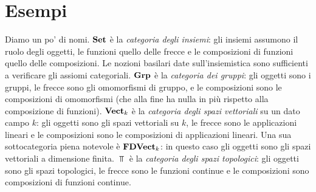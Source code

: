 
\section{Esempi}


\begin{esempio}
Diamo un po' di nomi.\newline
\(\mathbf{Set}\) è la {\em categoria degli insiemi}: gli insiemi assumono il ruolo degli oggetti, le funzioni quello delle frecce e le composizioni di funzioni quello delle composizioni. Le nozioni basilari date sull'insiemistica sono sufficienti a verificare gli assiomi categoriali.\newline
\(\mathbf{Grp}\) è la {\em categoria dei gruppi}: gli oggetti sono i gruppi, le frecce sono gli omomorfismi di gruppo, e le composizioni sono le composizioni di omomorfismi (che alla fine ha nulla in più rispetto alla composizione di funzioni).\newline
\(\mathbf{Vect}_k\) è la {\em categoria degli spazi vettoriali} su un dato campo \(k\): gli oggetti sono gli spazi vettoriali su \(k\), le frecce sono le applicazioni lineari e le composizioni sono le composizioni di applicazioni lineari. Una sua sottocategoria piena notevole è \(\mathbf{FDVect}_k\): in questo caso gli oggetti sono gli spazi vettoriali a dimensione finita.\newline
\(\Top\) è la {\em categoria degli spazi topologici}: gli oggetti sono gli spazi topologici, le frecce sono le funzioni continue e le composizioni sono composizioni di funzioni continue.%
\end{esempio}

